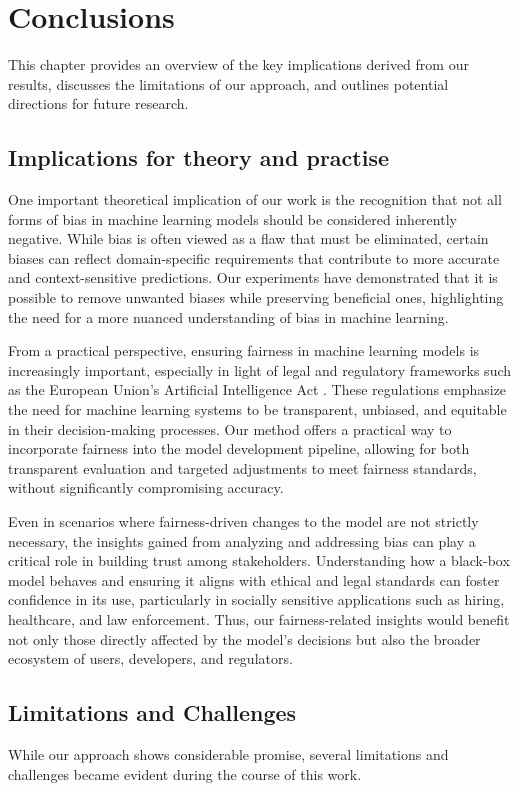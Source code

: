 %
\chapter{Conclusions}
This chapter provides an overview of the key implications derived from our results,  
discusses the limitations of our approach,  
and outlines potential directions for future research. 


\section{Implications for theory and practise}
One important theoretical implication of our work is the recognition that not all forms of bias
in machine learning models should be considered inherently negative.  
While bias is often viewed as a flaw that must be eliminated,
certain biases can reflect domain-specific requirements
that contribute to more accurate and context-sensitive predictions.  
Our experiments have demonstrated that it is possible to remove unwanted biases
while preserving beneficial ones, highlighting the need for a more nuanced understanding of bias in machine learning. 

From a practical perspective, ensuring fairness in machine learning models is increasingly important,
especially in light of legal and regulatory frameworks such as
the European Union's Artificial Intelligence Act \cite{aia}.  
These regulations emphasize the need for machine learning systems to be transparent,
unbiased, and equitable in their decision-making processes.  
Our method offers a practical way to incorporate fairness into the model development pipeline,
allowing for both transparent evaluation and targeted adjustments to meet fairness standards,
without significantly compromising accuracy.

Even in scenarios where fairness-driven changes to the model are not strictly necessary,
the insights gained from analyzing and addressing bias can play a critical role in building trust among stakeholders.  
Understanding how a black-box model behaves and ensuring it aligns
with ethical and legal standards can foster confidence in its use,
particularly in socially sensitive applications such as hiring, healthcare, and law enforcement.  
Thus, our fairness-related insights would benefit not only those directly affected by the model's decisions
but also the broader ecosystem of users, developers, and regulators.  


\section{Limitations and Challenges}
\label{sec:limitations}
While our approach shows considerable promise,
several limitations and challenges became evident during the course of this work. 

